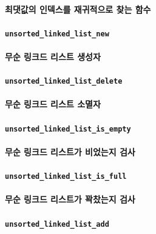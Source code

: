\documentclass[UTF8, a4paper]{report}
\begin{document}
            \paragraph{%
                \normalfont 최댓값의 인덱스를 재귀적으로 찾는 함수
            }

            \paragraph{\texttt{unsorted\_linked\_list\_new       }}
            \paragraph{%
                \normalfont 무순 링크드 리스트 생성자
            }

            \paragraph{\texttt{unsorted\_linked\_list\_delete    }}
            \paragraph{%
                \normalfont 무순 링크드 리스트 소멸자
            }

            \paragraph{\texttt{unsorted\_linked\_list\_is\_empty  }}
            \paragraph{%
                \normalfont 무순 링크드 리스트가 비었는지 검사
            }

            \paragraph{\texttt{unsorted\_linked\_list\_is\_full   }}
            \paragraph{%
                \normalfont 무순 링크드 리스트가 꽉찼는지 검사
            }

            \paragraph{\texttt{unsorted\_linked\_list\_add       }}
\end{document}
